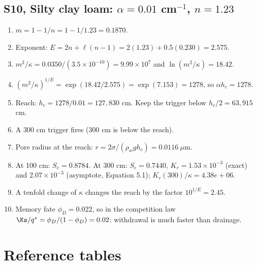 \section{S10, Silty clay loam: $\alpha=0.01$ cm$^{-1}$, $n=1.23$}
\begin{enumerate}[leftmargin=*,itemsep=1pt]
\item $m=1-1/n=1-1/1.23=0.1870$.
\item Exponent: $E=2n+\ell(n-1)=2(1.23)+0.5(0.230)=2.575$.
\item $m^2/\kappa=0.0350/(3.5\times10^{-10})=9.99\times10^{7}$ and $\ln(m^2/\kappa)=18.42$.
\item $(m^2/\kappa)^{1/E}=\exp(18.42/2.575)=\exp(7.153)=1278$, so $\alpha h_c=1278$.
\item Reach: $h_c=1278/0.01=127,830$ cm. Keep the trigger below $h_c/2=63,915$ cm.
\item A 300 cm trigger fires (300 cm is below the reach).
\item Pore radius at the reach: $r=2\sigma/(\rho_wgh_c)=0.0116\ \mu$m.
\item At 100 cm: $S_e=0.8784$. At 300 cm: $S_e=0.7440$, $K_r=1.53\times10^{-3}$ (exact) and $2.07\times10^{-3}$ (asymptote, Equation 5.1); $K_r(300)/\kappa=4.38e+06$.
\item A tenfold change of $\kappa$ changes the reach by the factor $10^{1/E}=2.45$.
\item Memory fate $\phi_D=0.022$, so in the competition law $\Ks/q^*=\phi_D/(1-\phi_D)=0.02$: withdrawal is much faster than drainage.
\end{enumerate}
\chapter{Reference tables}
